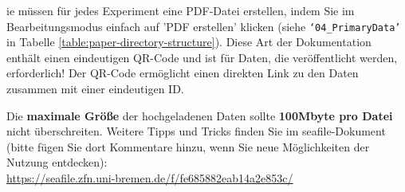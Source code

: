 ie müssen für jedes Experiment eine PDF-Datei erstellen, indem Sie im Bearbeitungsmodus einfach auf 'PDF erstellen' klicken (siehe
\texttt{‘04\_PrimaryData’} in Tabelle \ref{table:paper-directory-structure}).
Diese Art der Dokumentation enthält einen eindeutigen QR-Code und ist für Daten,
die veröffentlicht werden, erforderlich! Der QR-Code ermöglicht einen direkten
Link zu den Daten zusammen mit einer eindeutigen ID.

Die \textbf{maximale Größe} der hochgeladenen Daten sollte \textbf{100Mbyte pro
Datei} nicht überschreiten. Weitere Tipps und Tricks finden Sie im
seafile-Dokument (bitte fügen Sie dort Kommentare hinzu, wenn Sie neue
Möglichkeiten der Nutzung entdecken): \\
\url{https://seafile.zfn.uni-bremen.de/f/fe685882eab14a2e853c/}

